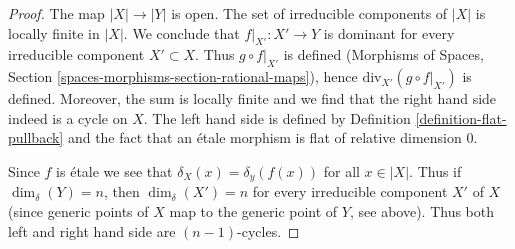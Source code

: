 \begin{proof}
The map $|X| \to |Y|$ is open. The set of irreducible components of $|X|$
is locally finite in $|X|$. We conclude that $f|_{X'} : X' \to Y$
is dominant for every irreducible component $X' \subset X$.
Thus $g \circ f|_{X'}$ is defined (Morphisms of Spaces, Section
\ref{spaces-morphisms-section-rational-maps}), hence
$\text{div}_{X'}(g \circ f|_{X'})$ is defined. Moreover, the
sum is locally finite and we find that the right hand side indeed
is a cycle on $X$. The left hand side is defined by
Definition \ref{definition-flat-pullback}
and the fact that an \'etale morphism is flat of relative dimension $0$.

\medskip\noindent
Since $f$ is \'etale we see that $\delta_X(x) = \delta_y(f(x))$
for all $x \in |X|$. Thus if $\dim_\delta(Y) = n$, then $\dim_\delta(X') = n$
for every irreducible component $X'$ of $X$ (since generic points of $X$
map to the generic point of $Y$, see above). Thus both left
and right hand side are $(n - 1)$-cycles.


\end{proof}
